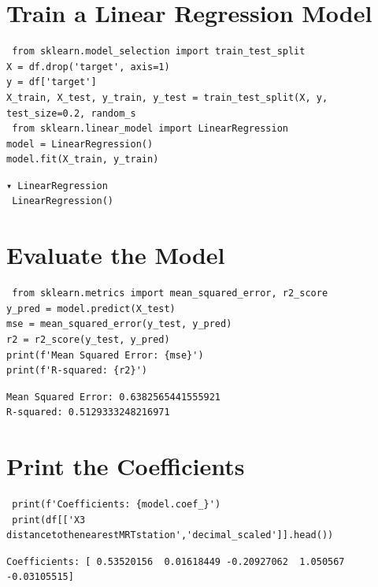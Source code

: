 \section{ Train a Linear Regression Model}
\begin{lstlisting}
 from sklearn.model_selection import train_test_split 
X = df.drop('target', axis=1) 
y = df['target'] 
X_train, X_test, y_train, y_test = train_test_split(X, y, test_size=0.2, random_s
 from sklearn.linear_model import LinearRegression 
model = LinearRegression() 
model.fit(X_train, y_train) 
\end{lstlisting}
\begin{verbatim}
▾ LinearRegression
 LinearRegression()        
\end{verbatim}
\section{Evaluate the Model}
\begin{lstlisting}
 from sklearn.metrics import mean_squared_error, r2_score 
y_pred = model.predict(X_test) 
mse = mean_squared_error(y_test, y_pred) 
r2 = r2_score(y_test, y_pred) 
print(f'Mean Squared Error: {mse}') 
print(f'R-squared: {r2}')
\end{lstlisting}
\begin{verbatim}
Mean Squared Error: 0.6382565441555921 
R-squared: 0.5129333248216971         
\end{verbatim}
\section{ Print the Coefficients}
\begin{lstlisting}
 print(f'Coefficients: {model.coef_}')
 print(df[['X3 distancetothenearestMRTstation','decimal_scaled']].head())
\end{lstlisting}
\begin{verbatim}
Coefficients: [ 0.53520156  0.01618449 -0.20927062  1.050567   -0.03105515] 
\end{verbatim}

  




